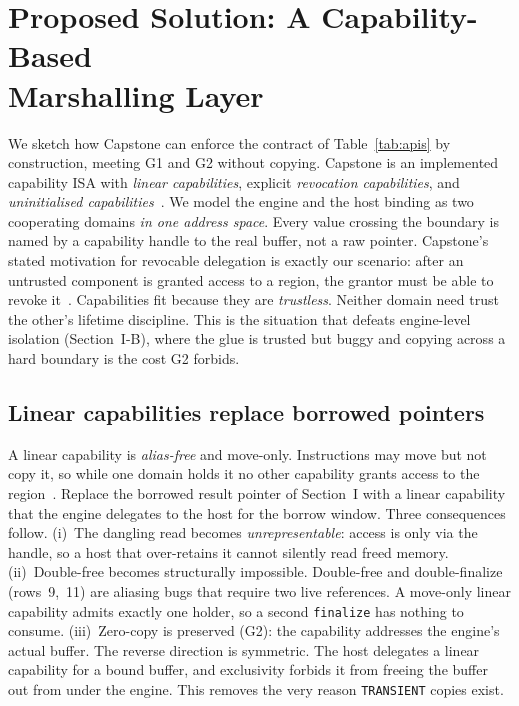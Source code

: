 \documentclass[10pt,twocolumn]{article}
\begin{document}
\section{Proposed Solution: A Capability-Based\\Marshalling Layer}
\label{sec:soln}

We sketch how Capstone can enforce the contract of Table~\ref{tab:apis} by
construction, meeting G1 and G2 without copying. Capstone is an implemented
capability ISA with \emph{linear capabilities}, explicit \emph{revocation
capabilities}, and \emph{uninitialised capabilities}~\cite{capstone,capstonespec}.
We model the engine and the host binding as two cooperating domains \emph{in one
address space}. Every value crossing the boundary is named by a capability
handle to the real buffer, not a raw pointer. Capstone's stated motivation for
revocable delegation is exactly our scenario: after an untrusted component is
granted access to a region, the grantor must be able to revoke
it~\cite{capstonespec}. Capabilities fit because they are \emph{trustless}.
Neither domain need trust the other's lifetime discipline. This is the situation
that defeats engine-level isolation (Section~I-B), where the glue is trusted but
buggy and copying across a hard boundary is the cost G2 forbids.

\subsection{Linear capabilities replace borrowed pointers}
A linear capability is \emph{alias-free} and move-only. Instructions may move
but not copy it, so while one domain holds it no other capability grants access
to the region~\cite{capstonespec}. Replace the borrowed result pointer of
Section~I with a linear capability that the engine delegates to the host for
the borrow window. Three consequences follow. (i)~The dangling read becomes
\emph{unrepresentable}: access is only via the handle, so a host that
over-retains it cannot silently read freed memory. (ii)~Double-free becomes
structurally impossible. Double-free and double-finalize (rows~9,~11) are
aliasing bugs that require two live references. A move-only linear capability
admits exactly one holder, so a second \texttt{finalize} has nothing to consume.
(iii)~Zero-copy is preserved (G2): the capability addresses the engine's actual
buffer. The reverse direction is symmetric. The host delegates a linear
capability for a bound buffer, and exclusivity forbids it from freeing the
buffer out from under the engine. This removes the very reason
\texttt{TRANSIENT} copies exist.
\end{document}
